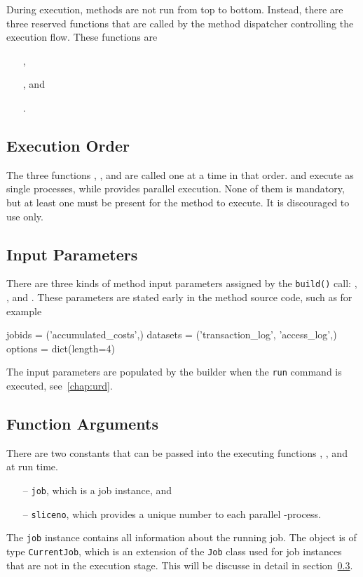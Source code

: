 During execution, methods are not run from top to bottom.  Instead,
there are three reserved functions that are called by the method
dispatcher controlling the execution flow.  These functions are
\begin{itemize}
\item [] \prepare,
\item [] \analysis, and
\item [] \synthesis.
\end{itemize}


\subsection{Execution Order}
The three functions \prepare, \analysis, and \synthesis are called one
at a time in that order.  \prepare and \synthesis execute as single
processes, while \analysis provides parallel execution.  None of them
is mandatory, but at least one must be present for the method to
execute.  It is discouraged to use \prepare only.


\subsection{Input Parameters}
There are three kinds of method input parameters assigned by the
\texttt{build()} call: \jobids, \datasets, and \options.  These
parameters are stated early in the method source code, such as for
example
\begin{python}
jobids = ('accumulated_costs',)
datasets = ('transaction_log', 'access_log',)
options = dict(length=4)
\end{python}
The input parameters are populated by the builder when the
\texttt{run} command is executed, see~\ref{chap:urd}.


\subsection{Function Arguments}
There are two constants that can be passed into the executing
functions \prepare, \analysis, and \synthesis at run time.
\begin{itemize}
\item[--] \texttt{job}, which is a job instance, and
\item[--] \texttt{sliceno}, which provides a unique number to each
  parallel \analysis-process.
\end{itemize}

The \texttt{job} instance contains all information about the running
job.  The object is of type \texttt{CurrentJob}, which is an extension
of the \texttt{Job} class used for job instances that are not in the
execution stage.  This will be discusse in detail in section~\ref{}.

